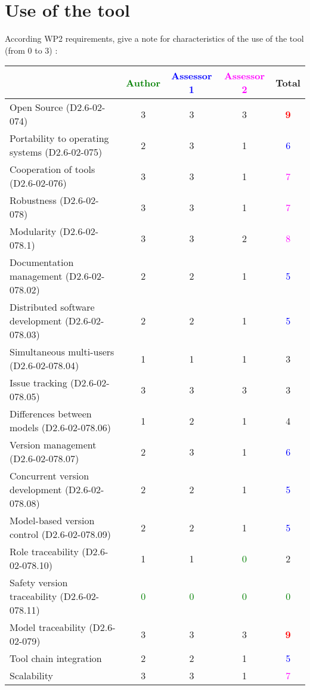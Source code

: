 \section{Use of the tool}

According WP2 requirements, give a note for characteristics of the use of the tool (from 0 to 3) :

\begin{tabular}{|l | c | c | c | c|}
\hline
& \textcolor{green}{Author} & \textcolor{blue}{Assessor 1} & \textcolor{magenta}{Assessor 2} & Total \\
\hline 
Open Source (D2.6-02-074) & 3     & 3     & 3     & \textcolor{red}{\textbf{9}}  \\
\hline 
Portability to operating systems (D2.6-02-075) & 2     & 3     & 1     & \textcolor{blue}{6}  \\
\hline
Cooperation of tools (D2.6-02-076) & 3     & 3     & 1     & \textcolor{magenta}{7} \\
\hline
Robustness (D2.6-02-078) & 3     & 3     & 1     & \textcolor{magenta}{7} \\
\hline
Modularity (D2.6-02-078.1) & 3     & 3     & 2     & \textcolor{magenta}{8} \\
\hline
Documentation management (D2.6-02-078.02) & 2     & 2     & 1     & \textcolor{blue}{5} \\
\hline
Distributed software development (D2.6-02-078.03)  & 2     & 2     & 1     & \textcolor{blue}{5} \\
\hline
Simultaneous multi-users (D2.6-02-078.04)   & 1     & 1     & 1     & 3     \\
\hline
Issue tracking (D2.6-02-078.05) & 3     & 3     & 3     & 3     \\
\hline
Differences between models (D2.6-02-078.06) & 1     & 2     & 1     & 4     \\
\hline
Version management (D2.6-02-078.07) & 2     & 3     & 1     & \textcolor{blue}{6} \\
\hline
Concurrent version development (D2.6-02-078.08) & 2     & 2     & 1     & \textcolor{blue}{5} \\
\hline
Model-based version control (D2.6-02-078.09) & 2     & 2     & 1     & \textcolor{blue}{5} \\
\hline
Role traceability (D2.6-02-078.10) & 1     & 1     & \textcolor{green}{0} & 2     \\
\hline
Safety version traceability (D2.6-02-078.11) & \textcolor{green}{0} & \textcolor{green}{0} & \textcolor{green}{0} & \textcolor{green}{0} \\
\hline
Model traceability (D2.6-02-079) & 3     & 3     & 3     & \textcolor{red}{\textbf{9}} \\
\hline
Tool chain integration & 2     & 2     & 1     & \textcolor{blue}{5} \\
\hline
Scalability & 3     & 3     & 1     & \textcolor{magenta}{7} \\
\hline
\end{tabular}

